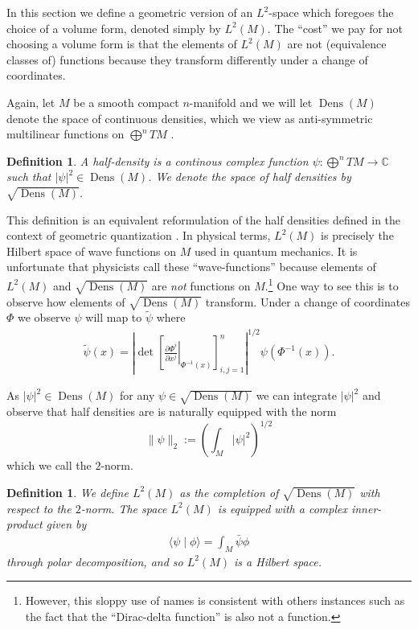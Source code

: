 \documentclass[12pt]{amsart}
\newcommand{\pder}[2]{\ensuremath{\frac{ \partial #1}{\partial #2}}}
\newtheorem{defn}[thm]{Definition}
\DeclareMathOperator{\Dens}{Dens}
\begin{document}
In this section we define a geometric version of an $L^{2}$-space which foregoes the choice of a volume form, denoted simply by $L^{2}(M)$.
The ``cost'' we pay for not choosing a volume form is that the elements of $L^{2}(M)$ are not (equivalence classes of) functions because they transform differently under a change of coordinates.

Again, let $M$ be a smooth compact $n$-manifold
and we will let $\Dens(M)$ denote the space of continuous densities,
which we view as anti-symmetric multilinear functions on $\bigoplus^n TM$ \cite[Chapter 16]{Lee2006}.

\begin{defn}\label{def:half density}
	A half-density is a continous complex function $\psi : \bigoplus^n TM \to \mathbb{C}$
	such that $| \psi |^{2} \in \Dens(M)$.
	We denote the space of half densities by $\sqrt{\Dens(M)}$.
\end{defn}

This definition is an equivalent reformulation of the half densities defined in the context of geometric quantization \cite{GuilleminSternberg1970,BatesWeinstein1997}.
In physical terms, $L^{2}(M)$ is precisely the Hilbert space of wave functions on $M$ used in quantum mechanics.
It is unfortunate that physicists call these ``wave-functions''
because elements of $L^{2}(M)$ and $\sqrt{\Dens(M)}$ are \emph{not} functions on $M$.\footnote{However, this sloppy use of names is consistent with others instances such as the fact that the ``Dirac-delta function'' is also not a function.}
One way to see this is to observe how elements of $\sqrt{\Dens(M)}$ transform.
Under a change of coordinates $\Phi$ we observe $\psi$ will map to $\tilde \psi$ where
\begin{align}
	\tilde{\psi}(x)  =  \left| \det \left[ \left. \pder{\Phi^{i}}{x^{j}} \right|_{\Phi^{-1}(x)} \right]_{i,j=1}^{n} \right|^{1/2} \psi( \Phi^{-1}(x) ). \label{eq:transformation law}
\end{align}


As $|\psi|^{2} \in \Dens(M)$ for any $\psi \in \sqrt{\Dens(M)}$ we can integrate $|\psi|^{2}$
and observe that half densities are is naturally equipped with the norm $$\| \psi \|_2 :=  \left( \int_M |\psi|^2 \right)^{1/2}$$ which we call the $2$-norm.

\begin{defn}
	We define $L^{2}(M)$ as the completion of $\sqrt{ \Dens(M)}$ with respect to the $2$-norm.
	The space $L^{2}(M)$ is equipped with a complex inner-product given by
	\begin{align}
		\langle \psi \mid \phi \rangle = \int_{M} \bar \psi \phi
	\end{align}
	through polar decomposition, and so $L^{2}(M)$ is a Hilbert space.
\end{defn}
\end{document}
